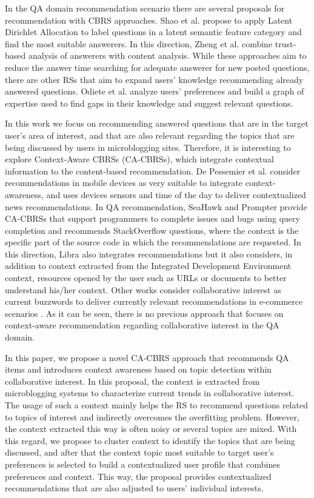 \documentclass[preprint]{elsarticle}
\begin{document}
\begin{spacing}{1.5}
In the QA domain recommendation scenario there are several proposals for recommendation with CBRS approaches. Shao et al.\cite{Shao2017} propose to apply Latent Dirichlet Allocation to label questions in a latent semantic feature category and find the most suitable answerers. In this direction, Zheng et al. \cite{Zheng2015b} combine trust-based analysis of answerers with content analysis. While these approaches aim to reduce the answer time searching for adequate answerer for new posted questions, there are other RSs that aim to expand users' knowledge recommending already answered questions. Odiete et al. \cite{Odiete2017} analyze users' preferences and build a graph of expertise used to find gaps in their knowledge and suggest relevant questions.

In this work we focus on recommending answered questions that are in the target user's area of interest, and that are also relevant regarding the topics that are being discussed by users in microblogging sites. Therefore, it is interesting to explore Context-Aware CBRSs (CA-CBRSs), which integrate contextual information to the content-based recommendation. De Pessemier et al. \cite{DePessemier2016} consider recommendations in mobile devices as very suitable to integrate context-awareness, and uses devices sensors and time of the day to deliver contextualized news recommendations. In QA recommendation, SeaHawk \cite{Ponzanelli2014} and Prompter \cite{Ponzanelli2014b} provide CA-CBRSs that support programmers to complete issues and bugs using query completion and recommends StackOverflow questions, where the context is the specific part of the source code in which the recommendations are requested. In this direction, Libra \cite{Ponzanelli2017} also integrates recommendations but it also considers, in addition to context extracted from the Integrated Development Environment context, resources opened by the user such as URLs or documents to better understand his/her context. Other works consider collaborative interest as current buzzwords to deliver currently relevant recommendations in e-commerce scenarios \cite{Parikh2009}. As it can be seen, there is no previous approach that focuses on context-aware recommendation regarding collaborative interest in the QA domain.

In this paper, we propose a novel CA-CBRS approach that recommends QA items and introduces context awareness based on topic detection within collaborative interest. In this proposal, the context is extracted from microblogging systems to characterize current trends in collaborative interest. The usage of such a context mainly helps the RS to recommend questions related to topics of interest and indirectly overcomes the overfitting problem. However, the context extracted this way is often noisy or several topics are mixed. With this regard, we propose to cluster context to identify the topics that are being discussed, and after that the context topic most suitable to target user's preferences is selected to build a contextualized user profile that combines preferences and context. This way, the proposal provides contextualized recommendations that are also adjusted to users' individual interests.


\end{spacing}
\end{document}
